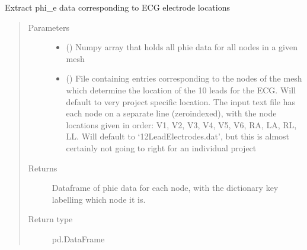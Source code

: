 \documentclass[letterpaper,10pt,english]{sphinxmanual}
\begin{document}
\begin{fulllineitems}
\label{\detokenize{_autosummary/signalanalysis.ecg.get_electrode_phie:signalanalysis.ecg.get_electrode_phie}}
\sphinxAtStartPar
Extract phi\_e data corresponding to ECG electrode locations
\begin{quote}\begin{description}
\item[{Parameters}] \leavevmode\begin{itemize}
\item {} 
\sphinxAtStartPar
{} () \textendash{} Numpy array that holds all phie data for all nodes in a given mesh

\item {} 
\sphinxAtStartPar
{} (\sphinxstyleliteralemphasis{\sphinxupquote{, }}) \textendash{} File containing entries corresponding to the nodes of the mesh which determine the location of the 10 leads
for the ECG. Will default to very project specific location. The input text file has each node on a separate
line (zero\sphinxhyphen{}indexed), with the node locations given in order: V1, V2, V3, V4, V5, V6, RA, LA, RL,
LL. Will default to ‘12LeadElectrodes.dat’, but this is almost certainly not going to right for an individual
project

\end{itemize}

\item[{Returns}] \leavevmode
\sphinxAtStartPar
{} \textendash{} Dataframe of phie data for each node, with the dictionary key labelling which node it is.

\item[{Return type}] \leavevmode
\sphinxAtStartPar
pd.DataFrame

\end{description}\end{quote}

\end{fulllineitems}
\end{document}
